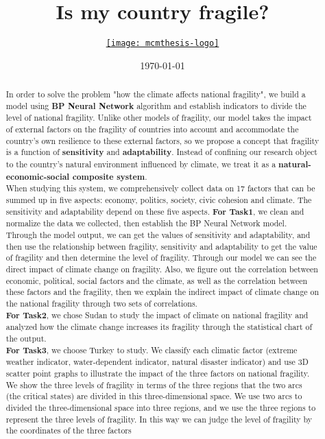 \documentclass{mcmthesis}
\title{Is my country fragile?}
\author{\small \href{http://www.latexstudio.net/}
  {\texttt{[image: mcmthesis-logo]}}}
\date{\today}
\begin{document}
\begin{abstract}
  In order to solve the problem "how the climate affects national fragility", we build a model using \textbf{BP Neural Network} algorithm and establish indicators to divide the level of national fragility. Unlike other models of fragility, our model takes the impact of external factors on the fragility of countries into account  and accommodate the country's own resilience to these external factors, so we propose a concept that fragility is a function of \textbf{sensitivity} and \textbf{adaptability}. Instead of confining our research object to the country's natural environment influenced by climate, we treat it as a \textbf{natural-economic-social composite system}. \\
  When studying this system, we comprehensively collect data on 17 factors that can be summed up in five aspects: economy, politics, society, civic cohesion and climate. The sensitivity and adaptability depend on these five aspects.
  \textbf{For Task1}, we clean and normalize the data we collected, then establish the BP Neural Network model. Through the model output, we can get the values ​​of sensitivity and adaptability, and then use the relationship between fragility, sensitivity and adaptability to get the value of fragility and then determine the level of fragility. Through our model we can see the direct impact of climate change on fragility. Also, we figure out the correlation between economic, political, social factors and the climate, as well as the correlation between these factors and the fragility, then we explain the indirect impact of climate change on the national fragility through two sets of correlations.\\
  \textbf{For Task2}, we chose Sudan to study the impact of climate on national fragility and analyzed how the climate change increases its fragility through the statistical chart of the output.\\
  \textbf{For Task3}, we choose Turkey to study. We classify each climatic factor (extreme weather indicator, water-dependent indicator, natural disaster indicator) and use 3D scatter point graphs to illustrate the impact of the three factors on national fragility. We show the three levels of fragility in terms of the three regions that the two arcs (the critical states) are divided in this three-dimensional space. We use two arcs to divided the three-dimensional space into three regions, and we use the three regions to represent the three levels of fragility. In this way we can judge the level of fragility by the coordinates of the three factors\\

\end{abstract}
\end{document}
